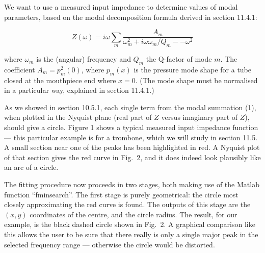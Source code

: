   We want to use a measured input impedance to determine values of modal 
  parameters, based on the modal decomposition formula derived in section 
  11.4.1: 

  \begin{equation*}Z(\omega) = i \omega \sum_m{\dfrac{A_m}{\omega_m^2+ i \omega 
  \omega_m/Q_m -- \omega^2}} \tag{1}\end{equation*} 

  \noindent{}where $\omega_m$ is the (angular) frequency and $Q_m$ the Q-factor 
  of mode $m$. The coefficient $A_m = p_m^2(0)$, where $p_m(x)$ is the pressure 
  mode shape for a tube closed at the mouthpiece end where $x=0$. (The mode 
  shape must be normalised in a particular way, explained in section 11.4.1.) 

  As we showed in section 10.5.1, each single term from the modal summation 
  (1), when plotted in the Nyquist plane (real part of $Z$ versus imaginary 
  part of $Z$), should give a circle. Figure 1 shows a typical measured input 
  impedance function — this particular example is for a trombone, which we will 
  study in section 11.5. A small section near one of the peaks has been 
  highlighted in red. A Nyquist plot of that section gives the red curve in 
  Fig.\ 2, and it does indeed look plausibly like an arc of a circle. 



  The fitting procedure now proceeds in two stages, both making use of the 
  Matlab function “fminsearch”. The first stage is purely geometrical: the 
  circle most closely approximating the red curve is found. The outputs of this 
  stage are the $(x,y)$ coordinates of the centre, and the circle radius. The 
  result, for our example, is the black dashed circle shown in Fig.\ 2. A 
  graphical comparison like this allows the user to be sure that there really 
  is only a single major peak in the selected frequency range — otherwise the 
  circle would be distorted. 

